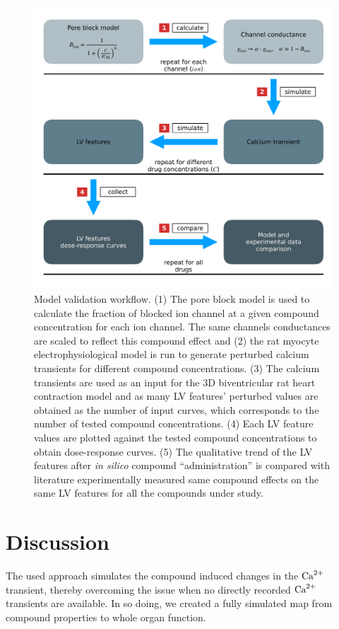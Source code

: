 \begin{figure}[!ht]
    \myfloatalign
    \includegraphics[width=\textwidth]{figures/chapter06/model_validation_schematic.pdf}
    \caption{Model validation workflow. (1) The pore block model is used to calculate the fraction of blocked ion channel at a given compound concentration for each ion channel. The same channels conductances are scaled to reflect this compound effect and (2) the rat myocyte electrophysiological model is run to generate perturbed calcium transients for different compound concentrations. (3) The calcium transients are used as an input for the $3$D biventricular rat heart contraction model and as many LV features' perturbed values are obtained as the number of input curves, which corresponds to the number of tested compound concentrations. (4) Each LV feature values are plotted against the tested compound concentrations to obtain dose-response curves. (5) The qualitative trend of the LV features after \textit{in silico} compound ``administration'' is compared with literature experimentally measured same compound effects on the same LV features for all the compounds under study.}
    \label{fig:validationschematic}
\end{figure}


%
%
%
\section{Discussion}\label{sec:ch6discussion}
The used approach simulates the compound induced changes in the $\textrm{Ca}^{2+}$ transient, thereby overcoming the issue when no directly recorded $\textrm{Ca}^{2+}$ transients are available. In so doing, we created a fully simulated map from compound properties to whole organ function.